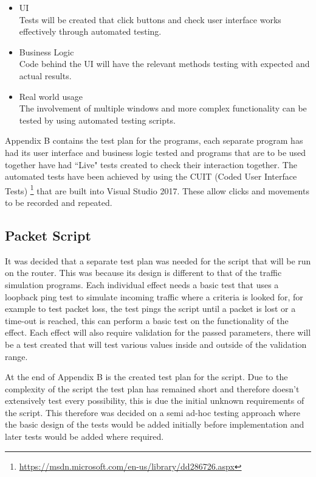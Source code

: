 \begin{itemize}
\item UI \\
Tests will be created that click buttons and check user interface works effectively through automated testing.

\item Business Logic \\
Code behind the UI will have the relevant methods testing with expected and actual results.

\item Real world usage \\
The involvement of multiple windows and more complex functionality can be tested by using automated testing scripts.
\end{itemize}

Appendix B contains the test plan for the programs, each separate program has had its user interface and business logic tested and programs that are to be used together have had ``Live" tests created to check their interaction together. The automated tests have been achieved by using the CUIT (Coded User Interface Tests) \footnote{\url{https://msdn.microsoft.com/en-us/library/dd286726.aspx}} that are built into Visual Studio 2017. These allow clicks and movements to be recorded and repeated.

\subsection{Packet Script}
It was decided that a separate test plan was needed for the script that will be run on the router. This was because its design is different to that of the traffic simulation programs. Each individual effect needs a basic test that uses a loopback ping test to simulate incoming traffic where a criteria is looked for, for example to test packet loss, the test pings the script until a packet is lost or a time-out is reached, this can perform a basic test on the functionality of the effect. Each effect will also require validation for the passed parameters, there will be a test created that will test various values inside and outside of the validation range.

At the end of Appendix B is the created test plan for the script. Due to the complexity of the script the test plan has remained short and therefore doesn't extensively test every possibility, this is due the initial unknown requirements of the script. This therefore was decided on a semi ad-hoc testing approach where the basic design of the tests would be added initially before implementation and later tests would be added where required.

